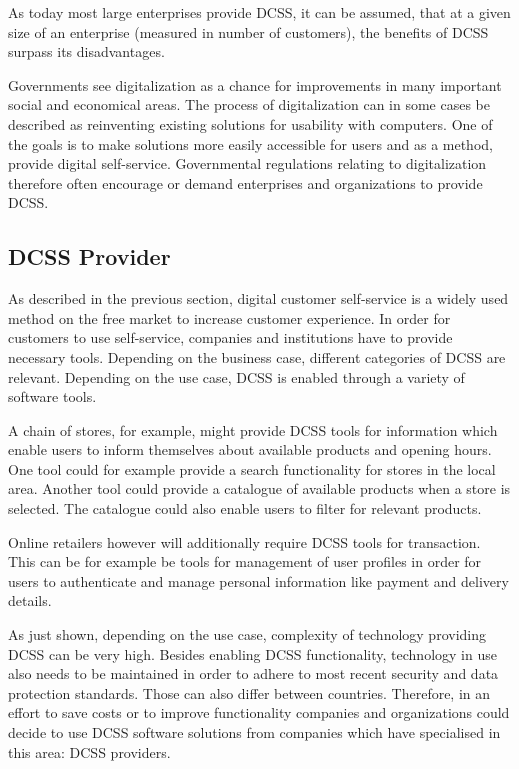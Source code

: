 \documentclass[
     12pt,         %
     a4paper,      %
     BCOR=10mm,version=first,     %
     DIV=14,version=first,        %
     ]{scrreprt}
\begin{document}
As today most large enterprises provide DCSS, it can be assumed, that at a given size of an enterprise (measured in number of customers), the benefits of DCSS surpass its disadvantages.

Governments see digitalization as a chance for improvements in many important social and economical areas. The process of digitalization can in some cases be described as reinventing existing solutions for usability with computers. One of the goals is to make solutions more easily accessible for users and as a method, provide digital self-service. Governmental regulations relating to digitalization therefore often encourage or demand enterprises and organizations to provide DCSS.

\subsection{DCSS Provider}
As described in the previous section, digital customer self-service is a widely used method on the free market to increase customer experience. In order for customers to use self-service, companies and institutions have to provide necessary tools. Depending on the business case, different categories of DCSS are relevant. Depending on the use case, DCSS is enabled through a variety of software tools.

A chain of stores, for example, might provide DCSS tools for information which enable users to inform themselves about available products and opening hours. One tool could for example provide a search functionality for stores in the local area. Another tool could provide a catalogue of available products when a store is selected. The catalogue could also enable users to filter for relevant products.

Online retailers however will additionally require DCSS tools for transaction. This can be for example be tools for management of user profiles in order for users to authenticate and manage personal information like payment and delivery details.

As just shown, depending on the use case, complexity of technology providing DCSS can be very high. Besides enabling DCSS functionality, technology in use also needs to be maintained in order to adhere to most recent security and data protection standards. Those can also differ between countries. Therefore, in an effort to save costs or to improve functionality companies and organizations could decide to use DCSS software solutions from companies which have specialised in this area: DCSS providers.
\end{document}
